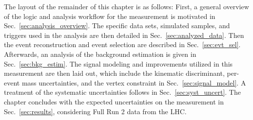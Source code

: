 The layout of the remainder of this chapter is as follows:
First, a general overview of the logic and analysis workflow for the \mH measurement is motivated in Sec.~\ref{sec:analysis_overview}.
The specific data sets, simulated samples, and triggers used in the analysis are then detailed in Sec.~\ref{sec:analyzed_data}.
Then the event reconstruction and event selection are described in Sec.~\ref{sec:evt_sel}.
Afterwards, an analysis of the background estimation is given in Sec.~\ref{sec:bkg_estim}.
The signal modeling and improvements utilized in this measurement are then laid out, which include the kinematic discriminant, per-event mass uncertainties, and the vertex constraint in Sec.~\ref{sec:signal_model}.
A treatment of the systematic uncertainties follows in Sec.~\ref{sec:syst_uncert}.
The chapter concludes with the expected uncertainties on the \mH measurement in Sec.~\ref{sec:results}, considering Full Run 2 data from the LHC.

